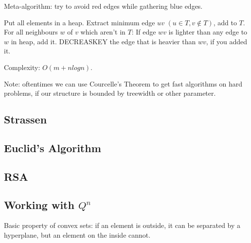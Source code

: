 

Meta-algorithm: try to avoid red edges while gathering blue edges.

\itemize\ibull
\: Put all elements in a heap.
\: Extract minimum edge $uv$ $(u ∈ T, v ∉ T)$, add to $T$.
\: For all neighbours $w$ of $v$ which aren't in $T$:
\: If edge $wv$ is lighter than any edge to $w$ in heap, add it.
\: DECREASKEY the edge that is heavier than $wv$, if you added it.
\endlist

Complexity: $O(m + n log n)$.

Note: oftentimes we can use Courcelle's Theorem to get fast algorithms
on hard problems, if our structure is bounded by treewidth or other parameter.



\subsection{Strassen}

\subsection{Euclid's Algorithm}

\subsection{RSA}

\subsection{Working with $Q^n$}





Basic property of convex sets: if an element is outside, it can be separated by a hyperplane,
but an element on the inside cannot.



